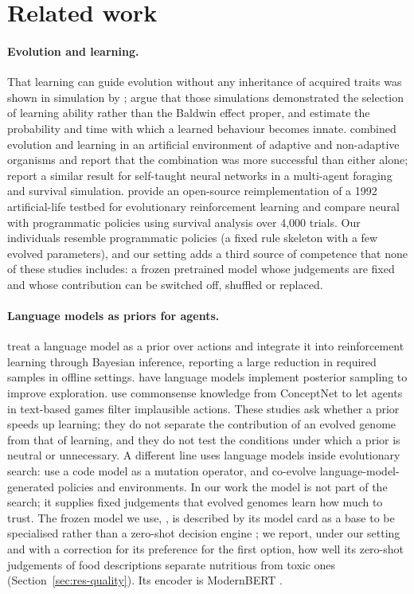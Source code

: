 \section{Related work}
\label{sec:related}

\paragraph{Evolution and learning.}
That learning can guide evolution without any inheritance of acquired traits was shown in simulation by \citet{hinton1987}; \citet{fontanari2017} argue that those simulations demonstrated the selection of learning ability rather than the Baldwin effect proper, and estimate the probability and time with which a learned behaviour becomes innate. \citet{ackley1992} combined evolution and learning in an artificial environment of adaptive and non-adaptive organisms and report that the combination was more successful than either alone; \citet{le2019baldwin} report a similar result for self-taught neural networks in a multi-agent foraging and survival simulation. \citet{roupassov2026} provide an open-source reimplementation of a 1992 artificial-life testbed for evolutionary reinforcement learning and compare neural with programmatic policies using survival analysis over 4,000 trials. Our individuals resemble programmatic policies (a fixed rule skeleton with a few evolved parameters), and our setting adds a third source of competence that none of these studies includes: a frozen pretrained model whose judgements are fixed and whose contribution can be switched off, shuffled or replaced.

\paragraph{Language models as priors for agents.}
\citet{yan2025llmprior} treat a language model as a prior over actions and integrate it into reinforcement learning through Bayesian inference, reporting a large reduction in required samples in offline settings. \citet{arumugam2025} have language models implement posterior sampling to improve exploration. \citet{murugesan2020} use commonsense knowledge from ConceptNet to let agents in text-based games filter implausible actions. These studies ask whether a prior speeds up learning; they do not separate the contribution of an evolved genome from that of learning, and they do not test the conditions under which a prior is neutral or unnecessary. A different line uses language models inside evolutionary search: \citet{lehman2022} use a code model as a mutation operator, and \citet{sygkounas2026} co-evolve language-model-generated policies and environments. In our work the model is not part of the search; it supplies fixed judgements that evolved genomes learn how much to trust. The frozen model we use, \laya{}, is described by its model card as a base to be specialised rather than a zero-shot decision engine \citep{laya}; we report, under our setting and with a correction for its preference for the first option, how well its zero-shot judgements of food descriptions separate nutritious from toxic ones (Section~\ref{sec:res-quality}). Its encoder is ModernBERT \citep{warner2024}.

